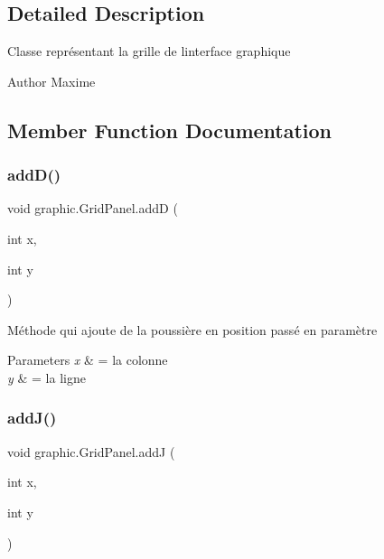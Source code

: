 \subsection{Detailed Description}
Classe représentant la grille de l\textquotesingle{}interface graphique \begin{DoxyAuthor}{Author}
Maxime 
\end{DoxyAuthor}


\subsection{Member Function Documentation}
\hypertarget{classgraphic_1_1_grid_panel_ac875580b8be1c0b3f2c895352a48a70b}{}\label{classgraphic_1_1_grid_panel_ac875580b8be1c0b3f2c895352a48a70b} 
\subsubsection{\texorpdfstring{add\+D()}{addD()}}
{\footnotesize\ttfamily void graphic.\+Grid\+Panel.\+addD (\begin{DoxyParamCaption}\item[{int}]{x,  }\item[{int}]{y }\end{DoxyParamCaption})}

Méthode qui ajoute de la poussière en position passé en paramètre 
\begin{DoxyParams}{Parameters}
{\em x} & = la colonne \\
\hline
{\em y} & = la ligne \\
\hline
\end{DoxyParams}
\hypertarget{classgraphic_1_1_grid_panel_a45010afc7fdcbcd0a4793c9d1e3b9130}{}\label{classgraphic_1_1_grid_panel_a45010afc7fdcbcd0a4793c9d1e3b9130} 
\subsubsection{\texorpdfstring{add\+J()}{addJ()}}
{\footnotesize\ttfamily void graphic.\+Grid\+Panel.\+addJ (\begin{DoxyParamCaption}\item[{int}]{x,  }\item[{int}]{y }\end{DoxyParamCaption})}

